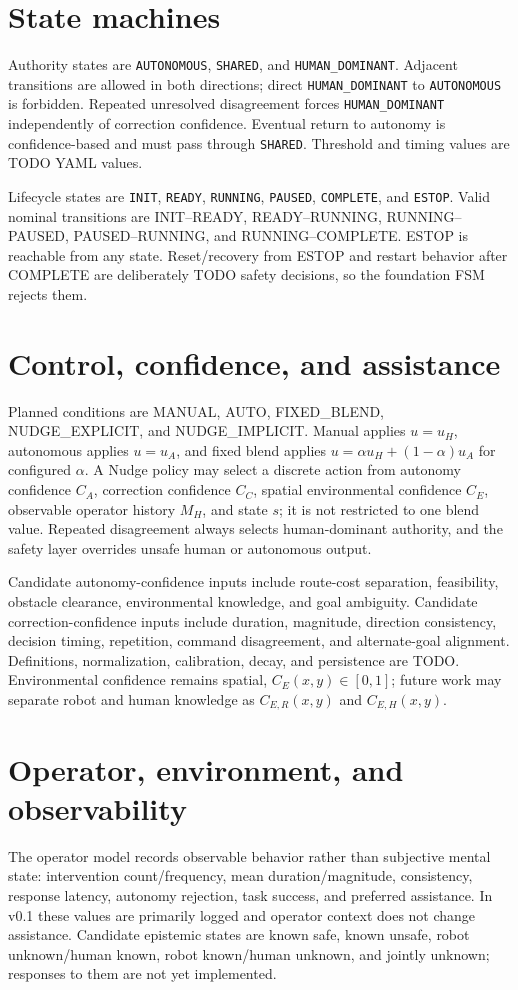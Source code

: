 \documentclass[11pt]{article}
\begin{document}
\section{State machines}
Authority states are \texttt{AUTONOMOUS}, \texttt{SHARED}, and
\texttt{HUMAN\_DOMINANT}. Adjacent transitions are allowed in both directions;
direct \texttt{HUMAN\_DOMINANT} to \texttt{AUTONOMOUS} is forbidden. Repeated
unresolved disagreement forces \texttt{HUMAN\_DOMINANT} independently of
correction confidence. Eventual return to autonomy is confidence-based and must
pass through \texttt{SHARED}. Threshold and timing values are TODO YAML values.

Lifecycle states are \texttt{INIT}, \texttt{READY}, \texttt{RUNNING},
\texttt{PAUSED}, \texttt{COMPLETE}, and \texttt{ESTOP}. Valid nominal
transitions are INIT--READY, READY--RUNNING, RUNNING--PAUSED,
PAUSED--RUNNING, and RUNNING--COMPLETE. ESTOP is reachable from any state.
Reset/recovery from ESTOP and restart behavior after COMPLETE are deliberately
TODO safety decisions, so the foundation FSM rejects them.

\section{Control, confidence, and assistance}
Planned conditions are MANUAL, AUTO, FIXED\_BLEND, NUDGE\_EXPLICIT, and
NUDGE\_IMPLICIT. Manual applies $u=u_H$, autonomous applies $u=u_A$, and fixed
blend applies $u=\alpha u_H+(1-\alpha)u_A$ for configured $\alpha$. A Nudge
policy may select a discrete action from autonomy confidence $C_A$, correction
confidence $C_C$, spatial environmental confidence $C_E$, observable operator
history $M_H$, and state $s$; it is not restricted to one blend value. Repeated
disagreement always selects human-dominant authority, and the safety layer
overrides unsafe human or autonomous output.

Candidate autonomy-confidence inputs include route-cost separation,
feasibility, obstacle clearance, environmental knowledge, and goal ambiguity.
Candidate correction-confidence inputs include duration, magnitude, direction
consistency, decision timing, repetition, command disagreement, and
alternate-goal alignment. Definitions, normalization, calibration, decay, and
persistence are TODO. Environmental confidence remains spatial,
$C_E(x,y)\in[0,1]$; future work may separate robot and human knowledge as
$C_{E,R}(x,y)$ and $C_{E,H}(x,y)$.

\section{Operator, environment, and observability}
The operator model records observable behavior rather than subjective mental
state: intervention count/frequency, mean duration/magnitude, consistency,
response latency, autonomy rejection, task success, and preferred assistance.
In v0.1 these values are primarily logged and operator context does not change
assistance. Candidate epistemic states are known safe, known unsafe, robot
unknown/human known, robot known/human unknown, and jointly unknown; responses
to them are not yet implemented.
\end{document}
